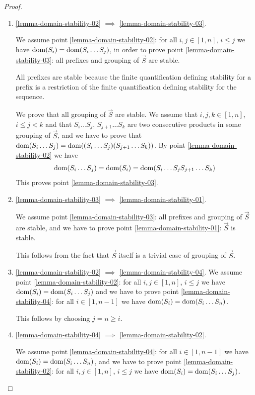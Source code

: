 \documentclass{lmcs}
\begin{document}
\begin{proof}
\begin{enumerate}
\item
\ref{lemma-domain-stability-02} $\implies$ \ref{lemma-domain-stability-03}.

We assume point \ref{lemma-domain-stability-02}: 
for all $i, j \in [1, n]$, $i \le j$ we have ${\rm dom}(S_i)  =  {\rm dom}(S_i \ldots S_j)$,
in order to prove point \ref{lemma-domain-stability-03}:
all prefixes and grouping of $\vec{S}$ are stable. 

All prefixes are stable because the finite quantification defining stability for a prefix 
is a restriction of the finite quantification defining stability for the sequence. 

We prove that all grouping of $\vec{S}$ are stable. We assume that
$i, j,k\in [1, n]$, $i \le j < k$ and that $S_i \ldots S_j$, $S_{j+1} \ldots S_k$
are two consecutive products in some grouping of $\vec{S}$, and we have to prove 
that ${\rm dom}(S_i \ldots S_j) = {\rm dom}( (S_i \ldots S_j) (S_{j+1} \ldots S_k))$. 
By point \ref{lemma-domain-stability-02} we have 
$$
{\rm dom}(S_i \ldots S_j) = {\rm dom}(S_i) = {\rm dom}(S_i \ldots S_j S_{j+1} \ldots S_k)
$$
This proves point \ref{lemma-domain-stability-03}.


\item
\ref{lemma-domain-stability-03} $\implies$ \ref{lemma-domain-stability-01}.

We assume point \ref{lemma-domain-stability-03}: all prefixes 
and grouping of $\vec{S}$ are stable,
and we have to prove point \ref{lemma-domain-stability-01}: $\vec{S}$ is stable. 

This follows from the fact that $\vec{S}$ itself is a trivial case of grouping of $\vec{S}$.


\item
\ref{lemma-domain-stability-02} $\implies$  \ref{lemma-domain-stability-04}.
We assume point \ref{lemma-domain-stability-02}:
for all $i, j \in [1, n]$, $i \le j$ we have ${\rm dom}(S_i) =  {\rm dom}(S_i \ldots S_j)$
and we have to prove point \ref{lemma-domain-stability-04}: 
for all $i \in [1, n-1]$ we have ${\rm dom}(S_i) =  {\rm dom}(S_i \ldots S_n)$.

This follows by choosing $j=n \ge i$.


\item
\ref{lemma-domain-stability-04} $\implies$  \ref{lemma-domain-stability-02}.

We assume point \ref{lemma-domain-stability-04}: 
for all $i \in [1, n-1]$ we have ${\rm dom}(S_i) =  {\rm dom}(S_i \ldots S_n)$, and we have to prove
point \ref{lemma-domain-stability-02}: 
for all $i, j \in [1, n]$, $i \le j$ we have ${\rm dom}(S_i) =  {\rm dom}(S_i \ldots S_j)$.


\end{enumerate}
\end{proof}
\end{document}
